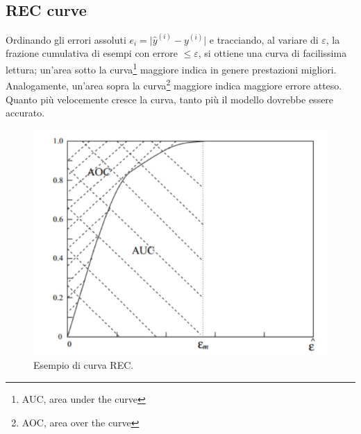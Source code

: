 \subsection{REC curve}
Ordinando gli errori assoluti \(e_i=\lvert \hat y^{(i)}-y^{(i)}\rvert\) e
tracciando, al variare di \(\varepsilon\), la frazione cumulativa di esempi con errore
\(\le\varepsilon\), si ottiene una curva di facilissima lettura; un’area sotto la curva\footnote{AUC, area under the curve} maggiore indica in genere prestazioni migliori. Analogamente, un'area sopra la curva\footnote{AOC, area over the curve} maggiore indica maggiore errore atteso. Quanto più velocemente cresce la curva, tanto più il modello dovrebbe essere accurato.

\begin{figure}[tbph]
	\centering
	\includegraphics[width=0.7\linewidth]{REC-curve}
	\caption{Esempio di curva REC.}
	\label{fig:rec-curve}
\end{figure}
